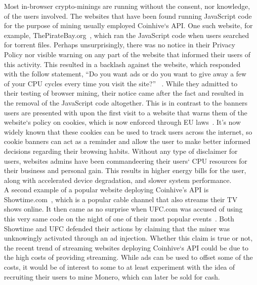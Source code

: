 Most in-browser crypto-minings are running without the consent, nor knowledge, of the users involved. The websites that have been found running JavaScript code for the purpose of mining usually employed Coinhive`s API. One such website, for example, ThePirateBay.org~\cite{bbcmintcrypto}, which ran the JavaScript code when users searched for torrent files. Perhaps unsurprisingly, there was no notice in their Privacy Policy nor visible warning on any part of the website that informed their users of this activity. This resulted in a backlash against the website, which responded with the follow statement, ``Do you want ads or do you want to give away a few of your CPU cycles every time you visit the site?'' ~\cite{piratesbayblog}. While they admitted to their testing of browser mining, their notice came after the fact and resulted in the removal of the JavaScript code altogether. This is in contrast to the banners users are presented with upon the first visit to a website that warns them of the website`s policy on cookies, which is now enforced through EU laws~\cite{eucookie}. It’s now widely known that these cookies can be used to track users across the internet, so cookie banners can act as a reminder and allow the user to make better informed decisions regarding their browsing habits. Without any type of disclaimer for users, websites admins have been commandeering their users` CPU resources for their business and personal gain. This results in higher energy bills for the user, along with accelerated device degradation, and slower system performance.
\\
A second example of a popular website deploying Coinhive’s API is Showtime.com~\cite{gaurdianelectricity}, which is a popular cable channel that also streams their TV shows online. It then came as no surprise when UFC.com was accused of using this very same code on the night of one of their most popular events~\cite{registerufcmonero}. Both Showtime and UFC defended their actions by claiming that the miner was unknowingly activated through an ad injection. Whether this claim is true or not, the recent trend of streaming websites deploying Coinhive`s API could be due to the high costs of providing streaming. While ads can be used to offset some of the costs, it would be of interest to some to at least experiment with the idea of recruiting their users to mine Monero, which can later be sold for cash.
\\
